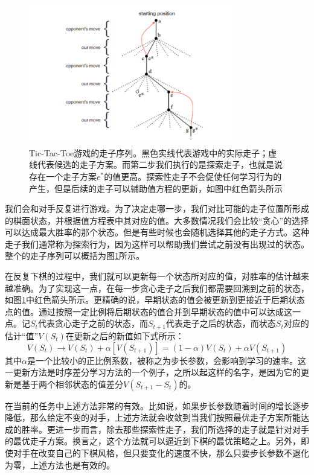 \documentclass{ctexart}
\begin{document}
            \begin{figure}
                \centering
                \includegraphics[width=0.8\textwidth]{f1-1}
                \caption{Tic-Tac-Toe游戏的走子序列。黑色实线代表游戏中的实际走子；虚线代表候选的走子方案。而第二步我们执行的是探索走子，也就是说存在一个走子方案$e^*$的值更高。探索性走子不会促使任何学习行为的产生，但是后续的走子可以辅助值方程的更新，如图中红色箭头所示}
                \label{f1_1}
            \end{figure}

            我们会和对手反复进行游戏。为了决定走哪一步，我们对比可能的走子位置所形成的棋面状态，并根据值方程表中其对应的值。大多数情况我们会比较“贪心”的选择可以达成最大胜率的那个状态。但是有些时候也会随机选择其他的走子方式。这种走子我们通常称为探索行为，因为这样可以帮助我们尝试之前没有出现过的状态。整个的走子序列可以概括为图\ref{f1_1}所示。

            在反复下棋的过程中，我们就可以更新每一个状态所对应的值，对胜率的估计越来越准确。为了实现这一点，在每一步贪心走子之后我们都需要回溯到之前的状态，如图\ref{f1_1}中红色箭头所示。更精确的说，早期状态的值会被更新到更接近于后期状态点的值。通过按照一定比例将后期状态的值合并到早期状态的值中可以达成这一点。记$S_t$代表贪心走子之前的状态，而$S_{t+1}$代表走子之后的状态，而状态$S_t$对应的估计“值”$V(S_t)$在更新之后的新值如下式所示：
            \begin{equation}
                V(S_t) \rightarrow V(S_t) + \alpha [V(S_{t+1})] = (1-\alpha)V(S_t) + \alpha V(S_{t+1})
                \label{e_1}
            \end{equation}
            其中$\alpha$是一个比较小的正比例系数，被称之为步长参数，会影响到学习的速率。这一更新方法是时序差分学习方法的一个例子，之所以起这样的名字，是因为它的更新是基于两个相邻状态的值差分$V(S_{t+1}-S_{t})$的。

            在当前的任务中上述方法非常的有效。比如说，如果步长参数随着时间的增长逐步降低，那么给定不变的对手，上述方法就会收敛到当我们按照最优走子方案所能达成的胜率。更进一步而言，除去那些探索性走子，我们所选择的走子就是针对对手的最优走子方案。换言之，这个方法就可以逼近到下棋的最优策略之上。另外，即使对手在改变自己的下棋风格，但只要变化的速度不快，那么只要步长参数不退化为零，上述方法也是有效的。
\end{document}
